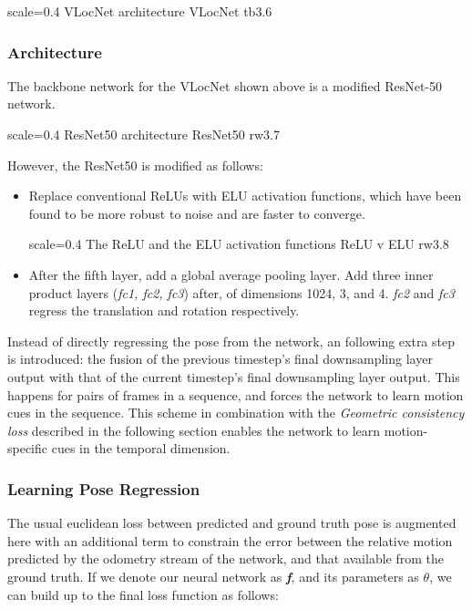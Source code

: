 {scale=0.4}%
{VLocNet architecture}%
{VLocNet}%
{tb3.6} %

\subsubsection{Architecture}
The backbone network for the VLocNet shown above is a modified ResNet-50 network.

{scale=0.4}%
{ResNet50 architecture}%
{ResNet50}%
{rw3.7} %

However, the ResNet50 is modified as follows:

\begin{itemize}
	\item Replace conventional ReLUs with ELU activation functions, which have been found to be more robust to noise and are faster to converge.
	
    {scale=0.4}%
    {The ReLU and the ELU activation functions}%
    {ReLU v ELU}%
	{rw3.8} %

	\item After the fifth layer, add a global average pooling layer. Add three inner product layers (\textit{fc1, fc2, fc3}) after, of dimensions 1024, 3, and 4.
\emph{fc2} and \emph{fc3} regress the translation and rotation respectively. 
\end{itemize}

	Instead of directly regressing the pose from the network, an following extra step is introduced: the fusion of the previous timestep's final downsampling layer output
with that of the current timestep's final downsampling layer output. This happens for pairs of frames in a sequence, and forces the network to learn motion cues in the sequence.
This scheme in combination with the \emph{Geometric consistency loss} described in the following section enables the network to learn motion-specific cues in the 
temporal dimension.

\subsubsection{Learning Pose Regression}
The usual euclidean loss between predicted and ground truth pose is augmented here with an additional term to constrain the error between the relative motion predicted
by the odometry stream of the network, and that available from the ground truth. If we denote our neural network as \textbf{\emph{f}}, and its parameters as $\theta$, we 
can build up to the final loss function as follows:

